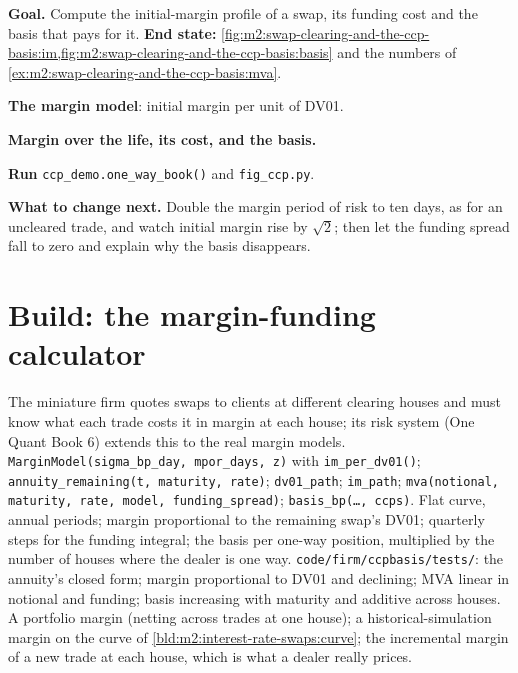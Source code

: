 \begin{tutorial}
\textbf{Goal.} Compute the initial-margin profile of a swap, its funding cost
and the basis that pays for it. \textbf{End state:}
\cref{fig:m2:swap-clearing-and-the-ccp-basis:im,fig:m2:swap-clearing-and-the-ccp-basis:basis}
and the numbers of \cref{ex:m2:swap-clearing-and-the-ccp-basis:mva}.
\begin{tutsteps}
\item \textbf{The margin model}: initial margin per unit of DV01.
\label{lst:m2:swap-clearing-and-the-ccp-basis:model}
\item \textbf{Margin over the life, its cost, and the basis.}
\label{lst:m2:swap-clearing-and-the-ccp-basis:mva}
\item \textbf{Run} \texttt{ccp\_demo.one\_way\_book()} and
\texttt{fig\_ccp.py}.
\end{tutsteps}
\textbf{What to change next.} Double the margin period of risk to ten days, as
for an uncleared trade, and watch initial margin rise by $\sqrt 2$; then let the
funding spread fall to zero and explain why the basis disappears.
\end{tutorial}

\section{Build: the margin-funding calculator}\label{bld:m2:swap-clearing-and-the-ccp-basis:mva}

\begin{build}
 The miniature firm quotes swaps to clients at different
clearing houses and must know what each trade costs it in margin at each
house; its risk system (One Quant Book 6) extends this to the real margin
models.
 \texttt{MarginModel(sigma\_bp\_day, mpor\_days, z)} with
\texttt{im\_per\_dv01()}; \texttt{annuity\_remaining(t, maturity, rate)};
\texttt{dv01\_path}; \texttt{im\_path}; \texttt{mva(notional, maturity, rate,
model, funding\_spread)}; \texttt{basis\_bp(\ldots, ccps)}.
 Flat curve, annual periods; margin proportional to the
remaining swap's DV01; quarterly steps for the funding integral; the basis per
one-way position, multiplied by the number of houses where the dealer is one
way.
 \texttt{code/firm/ccpbasis/tests/}: the annuity's
closed form; margin proportional to DV01 and declining; MVA linear in notional
and funding; basis increasing with maturity and additive across houses.
 A portfolio margin (netting across trades at one house); a
historical-simulation margin on the curve of
\cref{bld:m2:interest-rate-swaps:curve}; the incremental margin of a new trade
at each house, which is what a dealer really prices.
\end{build}

